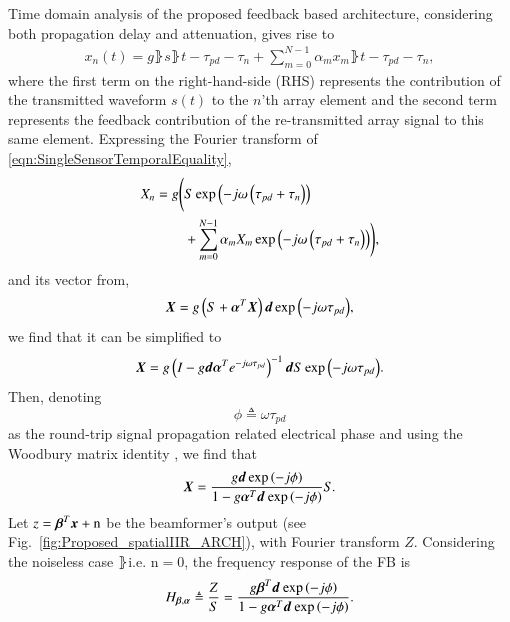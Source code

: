 Time domain analysis of the proposed feedback based architecture, considering both propagation delay and attenuation, gives rise to
\begin{equation}
    \label{eqn:SingleSensorTemporalEquality}
        \begin{split}
            x_{n}(t) = g\rBrace{s\rBrace{t-\tau_{pd}-\tau_{n}}
            +\sum_{m=0}^{N-1}{\alpha_{m}x_{m}\rBrace{t-\tau_{pd}-\tau_{n}}}},
        \end{split}
\end{equation}
where the first term on the right-hand-side (RHS) represents the contribution of the transmitted waveform $s(t)$ to the $n$'th array element and the second term represents the feedback contribution of the re-transmitted array signal to this same element.
Expressing the Fourier transform of \eqref{eqn:SingleSensorTemporalEquality},
\begin{equation}
    \label{eqn_singleSensorFourier}
        \begin{split}
            \F{x}_{n} =
            g\Bigg( & \F{s}
            \exp\rBrace{-j\omega\rBrace{\tau_{pd}+\tau_{n}}}
            \\&+\sum_{m=0}^{N-1}
            {
            \alpha_{m}\omegaB\F{x}_{m}
            \exp\rBrace{-j\omega\rBrace{\tau_{pd}+\tau_{n}}}
            }\Bigg),
        \end{split}
\end{equation}
and its vector from,
$$
\F{\vx} = g\rBrace{\F{s}+\vAlphaT \F{\vx}}\vd\exp{\rBrace{-j\omega\tau_{pd}}},
$$
we find that it can be simplified to
$$
\F{\vx} =g\rBrace{I-g\vd\vAlphaT{}e^{-j\omega\tau_{pd}}}^{-1}\vd\F{s}\exp{\rBrace{-j\omega\tau_{pd}}}.
$$
Then, denoting
\[
\phi\triangleq\omega\tau_{pd}
\]
as the round-trip signal propagation related electrical phase and using the Woodbury matrix identity \cite{woodbury1950inverting}, we find that
$$
\F{\vx}
=
\frac{    
g\vd\exp{\rBrace{-j\phi}}
}{
1 - g\aTd{}\exp{\rBrace{-j\phi}}
}\F{s}.
$$
Let $z=\vBetaT{}\vecnot{x}+\text{n}$ be the beamformer's output (see Fig.~\ref{fig:Proposed_spatialIIR_ARCH}), with Fourier transform $Z$. Considering the noiseless case $\rBrace{\text{i.e. n}=0}$, the frequency response of the FB is 
\begin{equation}
\label{eqn:GeneralFeedbackTransferFunction}
\Hba
\triangleq
\frac{\F{z}}{\F{s}} 
=
\frac{    
g\bTd{}\exp\rBrace{-j\phi}
}{
1 - g\aTd{}\exp\rBrace{-j\phi}
}.
\end{equation}
